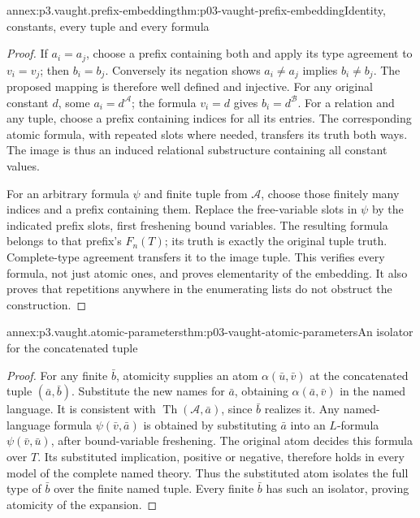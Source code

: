 \begin{annexitem}{annex:p3.vaught.prefix-embedding}{thm:p03-vaught-prefix-embedding}{Identity, constants, every tuple and every formula}
\begin{proof}
If \(a_i=a_j\), choose a prefix containing both and apply its type
agreement to \(v_i=v_j\); then \(b_i=b_j\). Conversely its negation
shows \(a_i\ne a_j\) implies \(b_i\ne b_j\).
The proposed mapping is therefore well defined and injective.
For any original constant \(d\), some \(a_i=d^{\mathcal A}\);
the formula \(v_i=d\) gives \(b_i=d^{\mathcal B}\).
For a relation and any tuple, choose a prefix containing indices
for all its entries. The corresponding atomic formula, with repeated
slots where needed, transfers its truth both ways. The image is thus
an induced relational substructure containing all constant values.

For an arbitrary formula \(\psi\) and finite tuple from \(\mathcal A\),
choose those finitely many indices and a prefix containing them.
Replace the free-variable slots in \(\psi\) by the indicated prefix
slots, first freshening bound variables. The resulting formula belongs
to that prefix's \(F_n(T)\); its truth is exactly the original
tuple truth. Complete-type agreement transfers it to the image
tuple. This verifies every formula, not just atomic ones, and proves
elementarity of the embedding. It also proves that repetitions
anywhere in the enumerating lists do not obstruct the construction.
\end{proof}
\end{annexitem}

\begin{annexitem}{annex:p3.vaught.atomic-parameters}{thm:p03-vaught-atomic-parameters}{An isolator for the concatenated tuple}
\begin{proof}
For any finite \(\bar b\), atomicity supplies an atom
\(\alpha(\bar u,\bar v)\) at the concatenated tuple
\((\bar a,\bar b)\). Substitute the new names for \(\bar a\),
obtaining \(\alpha(\bar a,\bar v)\) in the named language.
It is consistent with \(\operatorname{Th}(\mathcal A,\bar a)\),
since \(\bar b\) realizes it.
Any named-language formula \(\psi(\bar v,\bar a)\) is obtained
by substituting \(\bar a\) into an \(L\)-formula \(\psi(\bar v,\bar u)\),
after bound-variable freshening. The original atom decides this
formula over \(T\). Its substituted implication, positive or negative,
therefore holds in every model of the complete named theory.
Thus the substituted atom isolates the full type of \(\bar b\)
over the finite named tuple. Every finite \(\bar b\) has such an
isolator, proving atomicity of the expansion.
\end{proof}
\end{annexitem}

